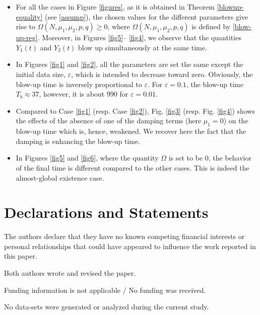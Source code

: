 \documentclass[12pt,leqno]{amsart}
\numberwithin{equation}{section}
\theoremstyle{remark}
\begin{document}
\begin{itemize}
\item[($i$)] For all the cases in Figure \ref{figures}, as it is obtained in Theorem \ref{blowup-equality} (see \eqref{assump}), the chosen values for the different parameters give rise to $\Omega(N,\mu_1,\mu_2,p,q) \ge 0$, where $\Omega(N,\mu_1,\mu_2,p,q)$ is defined by \eqref{blow-up-reg}. Moreover, in Figures \ref{fig5}-- \ref{fig4}, we observe that the quantities $Y_1(t)$ and $Y_2(t)$ blow up simultaneously at the same time. 
\item[($ii$)] In Figures \ref{fig1} and \ref{fig2}, all the parameters are set the same except the initial data size, $\varepsilon$, which is intended to decrease toward zero. Obviously, the blow-up time is inversely proportional to  $\varepsilon$. For $\varepsilon = 0.1$, the blow-up time $T_b \approx 37$, however, it is about $990$ for $\varepsilon = 0.01$.
\item[($iii$)] Compared to Case \ref{fig1} (resp. Case \ref{fig2}), Fig. \ref{fig3} (resp. Fig. \ref{fig4}) shows the effects of the absence of one of the damping terms (here $\mu_1=0$) on the blow-up time which is, hence, weakened. We recover here the fact that the damping is enhancing the blow-up time. 
\item[($iv$)] In Figures \ref{fig5} and \ref{fig6}, where the quantity  $\Omega$ is set to be $0$, the behavior of the final time is different compared to the other cases. This is indeed the almost-global existence case. 
\end{itemize}

\section*{\bf\Large Declarations and Statements}



The authors declare that they have no known competing financial interests or personal relationships that could have appeared to influence the work reported in this paper.
\medskip

Both authors wrote and revised the paper.
\medskip

Funding information is not applicable / No funding was received. 
\medskip

No data-sets were generated or analyzed during the current study.
\medskip
\end{document}
